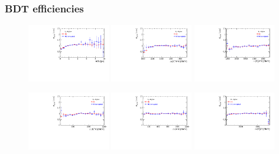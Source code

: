 \clearpage
\subsubsection{BDT efficiencies}

\begin{figure}[h]
\includegraphics[height=!,width=0.32\textwidth]{figs/dataVsMC/signal_bdt/eff_Ds2KKpi_1_Bs_DTF_TAU.pdf}
\includegraphics[height=!,width=0.32\textwidth]{figs/dataVsMC/signal_bdt/eff_Ds2KKpi_1_m_Kpipi.pdf}
\includegraphics[height=!,width=0.32\textwidth]{figs/dataVsMC/signal_bdt/eff_Ds2KKpi_1_m_Dspipi.pdf}

\includegraphics[height=!,width=0.32\textwidth]{figs/dataVsMC/signal_bdt/eff_Ds2KKpi_1_m_Kpi.pdf}
\includegraphics[height=!,width=0.32\textwidth]{figs/dataVsMC/signal_bdt/eff_Ds2KKpi_1_m_pipi.pdf}
\includegraphics[height=!,width=0.32\textwidth]{figs/dataVsMC/signal_bdt/eff_Ds2KKpi_1_m_Dspi.pdf}
\caption{}
\label{fig:}
\end{figure}


